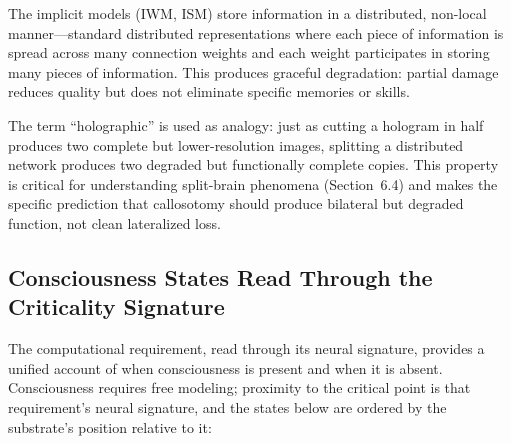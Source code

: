 \documentclass[12pt]{article}
\begin{document}
The implicit models (IWM, ISM) store information in a distributed, non-local manner---\hspace{0pt}standard distributed representations \citep{Hinton1986} where each piece of information is spread across many connection weights and each weight participates in storing many pieces of information. This produces graceful degradation: partial damage reduces quality but does not eliminate specific memories or skills.

The term ``holographic'' is used as analogy: just as cutting a hologram in half produces two complete but lower-resolution images, splitting a distributed network produces two degraded but functionally complete copies. This property is critical for understanding split-brain phenomena (Section~6.4) and makes the specific prediction that callosotomy should produce bilateral but degraded function, not clean lateralized loss.


\subsection{Consciousness States Read Through the Criticality Signature}

The computational requirement, read through its neural signature, provides a unified account of when consciousness is present and when it is absent. Consciousness requires free modeling; proximity to the critical point is that requirement's neural signature, and the states below are ordered by the substrate's position relative to it:
\end{document}
